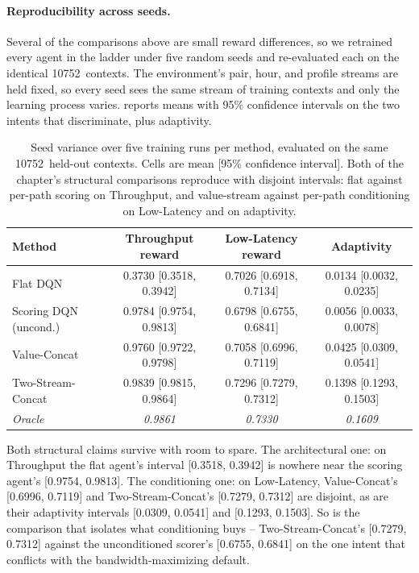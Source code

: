 \paragraph{Reproducibility across seeds.} Several of the comparisons above are small reward differences,
so we retrained every agent in the ladder under five random seeds and re-evaluated each on the identical
10752~contexts. The environment's pair, hour, and profile streams are held fixed, so every seed sees the
same stream of training contexts and only the learning process varies.
 reports means with 95\% confidence intervals on the two intents that
discriminate, plus adaptivity.

\begin{table}[t]
  \centering
  \caption[Seed variance over five training runs per method]{Seed variance over five training runs per method, evaluated on the same 10752~held-out
  contexts. Cells are mean [95\% confidence interval]. Both of the chapter's structural comparisons
  reproduce with disjoint intervals: flat against per-path scoring on Throughput, and value-stream
  against per-path conditioning on Low-Latency and on adaptivity.}
  \label{tab:p1eval:seeds}
  \small
  \setlength{\tabcolsep}{4pt}
  \begin{tabular}{lccc}
    \toprule
    Method & Throughput reward & Low-Latency reward & Adaptivity \\
    \midrule
    Flat DQN              & 0.3730 [0.3518, 0.3942] & 0.7026 [0.6918, 0.7134]
                          & 0.0134 [0.0032, 0.0235] \\
    Scoring DQN (uncond.) & 0.9784 [0.9754, 0.9813] & 0.6798 [0.6755, 0.6841]
                          & 0.0056 [0.0033, 0.0078] \\
    Value-Concat          & 0.9760 [0.9722, 0.9798] & 0.7058 [0.6996, 0.7119]
                          & 0.0425 [0.0309, 0.0541] \\
    Two-Stream-Concat     & 0.9839 [0.9815, 0.9864] & 0.7296 [0.7279, 0.7312]
                          & 0.1398 [0.1293, 0.1503] \\
    \midrule
    \emph{Oracle}         & \emph{0.9861} & \emph{0.7330} & \emph{0.1609} \\
    \bottomrule
  \end{tabular}
\end{table}

Both structural claims survive with room to spare. The architectural one: on Throughput the flat agent's
interval [0.3518, 0.3942] is nowhere near the scoring agent's [0.9754, 0.9813]. The conditioning one: on
Low-Latency, Value-Concat's [0.6996, 0.7119] and Two-Stream-Concat's [0.7279, 0.7312] are disjoint, as
are their adaptivity intervals [0.0309, 0.0541] and [0.1293, 0.1503]. So is the comparison that isolates
what conditioning buys -- Two-Stream-Concat's [0.7279, 0.7312] against the unconditioned scorer's
[0.6755, 0.6841] on the one intent that conflicts with the bandwidth-maximizing default.

